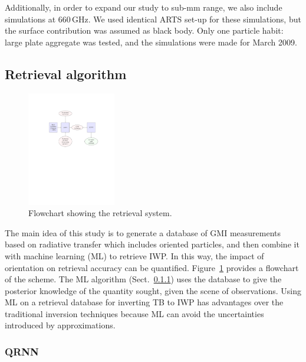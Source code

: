 \documentclass[amt, manuscript]{copernicus}
\begin{document}
Additionally, in order to expand our study to sub-mm range, we also include simulations at 660\,GHz. We used identical ARTS set-up for these simulations, but the surface contribution was assumed as black body. Only one particle habit: large plate aggregate was tested, and the simulations were made for March 2009.  




\subsection{Retrieval algorithm}
\label{sec:retrieval_algo}

\begin{figure}[t]
	\includegraphics[trim=100 410 100 125,clip,height = 50mm, ]{Figures/flowchart.pdf}
	\caption{Flowchart showing the retrieval system.}
	\label{fig:flowchart}
\end{figure}

The main idea of this study is to generate a database of GMI measurements based on radiative transfer which includes oriented particles, and then combine it with machine learning (ML) to retrieve IWP. In this way, the impact of orientation on retrieval accuracy can be quantified. Figure~\ref{fig:flowchart} provides a flowchart of the scheme. The ML algorithm (Sect.~\ref{sec:QRNN}) uses the database to give the posterior knowledge of the quantity sought, given the scene of observations. Using ML on a retrieval database for inverting TB to IWP has advantages over the traditional inversion techniques because ML can avoid the uncertainties introduced by approximations. 

\subsubsection{QRNN}
\label{sec:QRNN}
\end{document}
